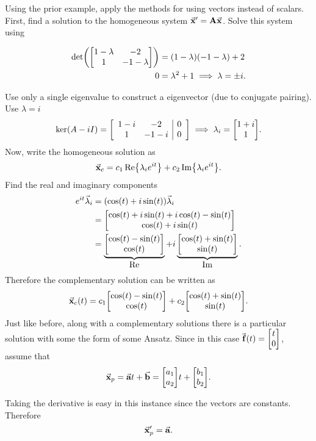 \documentclass[../notes.tex]{subfiles}
\begin{document}
Using the prior example, apply the methods for  using vectors instead of scalars. First, find a solution to the homogeneous system $\va{x}' = \vb{A}\va{x}$. Solve this system using 
{
    \newcommand{\eig}{\lambda}
\begin{align*}
    \det(\mqty[1 - \eig & -2 \\ 1 & -1 - \eig]) &= (1-\eig)(-1-\eig)+2 \\
    0 &= \eig^2 +1 \implies \eig = \pm i
.\end{align*}

Use only a single eigenvalue to construct a eigenvector (due to conjugate pairing). Use $\eig = i$
 \[
    \ker(A - iI) = \qty[\begin{array}{cc|c}
        1-i & -2 & 0\\
        1 & -1-i & 0
    \end{array}] \implies
    \eig_i = \mqty[1+i \\ 1]
.\] 
Now, write the homogeneous solution as
\[
    \va{x}_c = c_1\Re{\eig_i e^{it}} + c_2\Im{\eig_i e^{it}}
.\]
Find the real and imaginary components
\begin{align*}
    e^{it} \va{\eig}_i &= \qty(\cos(t) + i \sin(t)) \va{\eig}_i \\
                       &= \mqty[\cos(t) + i \sin(t) + i \cos(t) - \sin(t) \\ \cos(t) + i \sin(t)] \\
                       &= \underbrace{\mqty[\cos(t) - \sin(t) \\ \cos(t)]}_{\textstyle\text{Re}} + i \underbrace{\mqty[\cos(t) + \sin(t) \\ \sin(t)]}_{\textstyle\text{Im}}
.\end{align*}
Therefore the complementary solution can be written as
\[
    \va{x}_c (t) = c_1 \mqty[\cos(t) - \sin(t) \\ \cos(t)] + c_2 \mqty[\cos(t) + \sin(t) \\ \sin(t)]
.\]
Just like before, along with a complementary solutions there is a particular solution with some the form of some Ansatz. Since in this case $\va{f}(t) = \mqty[t \\ 0]$, assume that
 \[
     \va{x}_p = \va{a} t + \va{b} = \mqty[a_1 \\ a_2] t + \mqty[b_1 \\ b_2]
.\] 

Taking the derivative is easy in this instance since the vectors are constants. Therefore
\[
    \va{x}_p' = \va{a}
.\]

}
\end{document}
